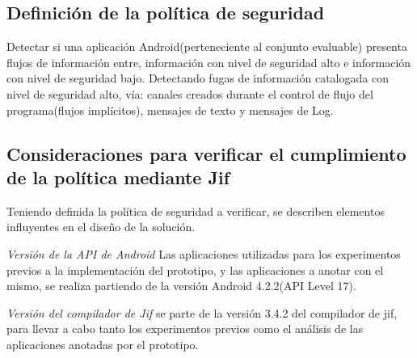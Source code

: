 \subsection{Definición de la política de seguridad}
\label{subsection:politica}
Detectar si una aplicación Android(perteneciente al conjunto evaluable) presenta
flujos de información entre, información con nivel de seguridad alto e
información con nivel de seguridad bajo.\newline
Detectando fugas de información catalogada con nivel de seguridad alto, vía:
canales creados durante el control de flujo del programa(flujos implícitos),
mensajes de texto y mensajes de Log.\newline 

\subsection{Consideraciones para verificar el cumplimiento de la política
mediante Jif} 
\label{subsec:consVerPol}
Teniendo definida la política de seguridad a verificar, se describen
elementos influyentes en el diseño de la solución.

\textit{Versión de la API de Android}\newline
Las aplicaciones utilizadas para los experimentos previos a la implementación
del prototipo, y las aplicaciones a anotar con el mismo, se realiza partiendo de
la versión Android 4.2.2(API Level 17).

\textit{Versión del compilador de Jif}\newline
se parte de la versión 3.4.2 del compilador de jif, para llevar a cabo tanto los
experimentos previos como el análisis de las aplicaciones anotadas por el prototipo.

